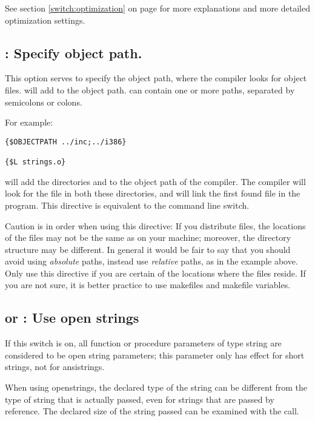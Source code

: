 See section \ref{switch:optimization} on page \pageref{switch:optimization}
for more explanations and more detailed optimization settings.

\subsection{ : Specify object path.}

This option serves to specify the object path, where the compiler looks for
object files.  will add  to the object
path.  can contain one or more paths, separated by semicolons or
colons.

For example:
\begin{verbatim}
{$OBJECTPATH ../inc;../i386}

{$L strings.o}
\end{verbatim}

will add the directories  and  to the
object path of the compiler. The compiler will look for the file 
in both these directories, and will link the first found file in the
program. This directive is equivalent to the  command line switch.

Caution is in order when using this directive: If you distribute files, the
locations of the files may not be the same as on your machine; moreover, the
directory structure may be different. In general it would be fair to say
that you should avoid using {\em absolute} paths, instead use {\em relative}
paths, as in the example above. Only use this directive if you are certain
of the locations where the files reside. If you are not sure, it is better
practice to use makefiles and makefile variables.

\subsection{ or  : Use open strings}

If this switch is on, all function or procedure parameters of type string
are considered to be open string parameters; this parameter only has effect
for short strings, not for ansistrings.

When using openstrings, the declared type of the string can be different
from the type of string that is actually passed, even for strings that are
passed by reference. The declared size of the string passed can be examined
with the  call.

